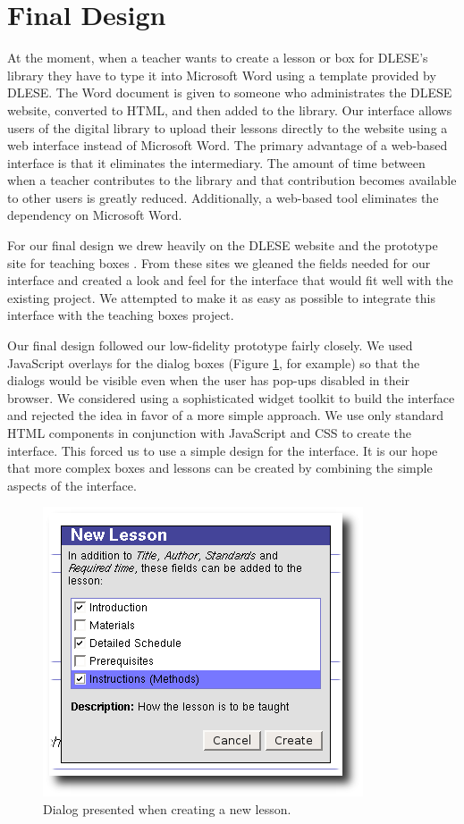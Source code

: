 \documentclass[10pt,letter]{article}
\begin{document}
\section{Final Design}
At the moment, when a teacher wants to create a lesson or box for DLESE's
library they have to type it into Microsoft Word using a template provided by
DLESE. The Word document is given to someone who administrates the DLESE
website, converted to HTML, and then added to the library. Our interface allows
users of the digital library to upload their lessons directly to the website
using a web interface instead of Microsoft Word. The primary advantage of a
web-based interface is that it eliminates the intermediary. The amount of time
between when a teacher contributes to the library and that contribution becomes
available to other users is greatly reduced. Additionally, a web-based tool
eliminates the dependency on Microsoft Word.

For our final design we drew heavily on the DLESE website \cite{bib:preview} and
the prototype site for teaching boxes \cite{bib:teachingboxes.org}. From these
sites we gleaned the fields needed for our interface and created a look and feel
for the interface that would fit well with the existing project. We attempted to
make it as easy as possible to integrate this interface with the teaching boxes
project.

Our final design followed our low-fidelity prototype fairly closely. We used
JavaScript overlays for the dialog boxes (Figure \ref{fig: new lesson ss}, for
example) so that the dialogs would be visible even when the user has pop-ups
disabled in their browser. We considered using a sophisticated widget toolkit to
build the interface and rejected the idea in favor of a more simple approach. We
use only standard HTML components in conjunction with JavaScript and CSS to
create the interface. This forced us to use a simple design for the interface.
It is our hope that more complex boxes and lessons can be created by combining
the simple aspects of the interface.

\begin{figure}
	\centering
	\includegraphics[width=0.45\linewidth]{figures/new_lesson}
	\caption{Dialog presented when creating a new lesson.}
	\label{fig: new lesson ss}
\end{figure}
\end{document}

